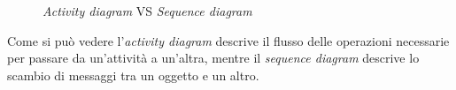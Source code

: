 \documentclass[12pt, a4paper]{report}
\theoremstyle{def}
\theoremstyle{definition}
\begin{document}
\begin{figure}[th]
    \centering
    \hfill
    \caption{\emph{Activity diagram} VS \emph{Sequence diagram}}
\end{figure}\noindent
Come si può vedere l'\emph{activity diagram} descrive il flusso delle operazioni
necessarie per passare da un'attività a un'altra, mentre il \emph{sequence
diagram} descrive lo scambio di messaggi tra un oggetto e un altro.
\end{document}

